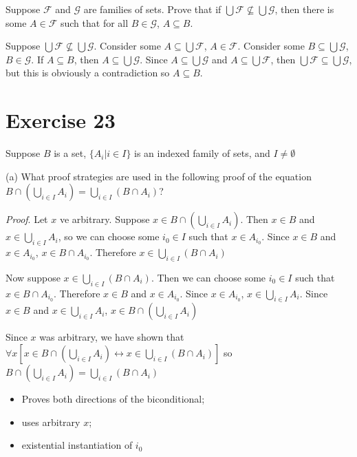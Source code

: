 \documentclass[11pt]{article}
\newcommand{\bicond}{\leftrightarrow}
\newcommand{\family}[1]{\mathcal{#1}}
\begin{document}
Suppose $\family{F}$ and $\family{G}$ are families of sets. Prove that if 
$\bigcup \family{F} \nsubseteq \bigcup \family{G}$, then there is some 
$A \in \family{F}$ such that for all $B \in \family{G}$, $A \subseteq B$.

Suppose $\bigcup \family{F} \nsubseteq \bigcup \family{G}$. Consider some 
$A \subseteq \bigcup \family{F}$, $A \in \family{F}$. Consider some 
$B \subseteq \bigcup \family{G}$, $B \in \family{G}$. If $A \subseteq B$,
then $A \subseteq \bigcup \family{G}$. Since $A \subseteq \bigcup \family{G}$
and $A \subseteq \bigcup \family{F}$, then 
$\bigcup \family{F} \subseteq \bigcup \family{G}$, but this is obviously a 
contradiction so $A \subseteq B$.

\section*{Exercise 23}

Suppose $B$ is a set, $\{ A_i | i \in I \}$ is an indexed family of sets,
and $I \neq \emptyset$

\noindent (a) What proof strategies are used in the following proof of the 
equation $B \cap (\bigcup_{i \in I} A_i) = \bigcup_{i \in I} (B \cap A_i)$?

\textit{Proof}. Let $x$ ve arbitrary. Suppose $x \in B \cap (\bigcup_{i \in I} A_i)$.
Then $x \in B$ and $x \in \bigcup_{i \in I} A_i$, so we can choose some 
$i_0 \in I$ such that $x \in A_{i_0}$. Since $x \in B$ and $x \in A_{i_0}$,
$x \in B \cap A_{i_0}$. Therefore $x \in \bigcup_{i \in I} (B \cap A_i)$

Now suppose $x \in \bigcup_{i \in I} (B \cap A_i)$. Then we can choose some 
$i_0 \in I$ such that $x \in B \cap A_{i_0}$. Therefore $x \in B$ and 
$x \in A_{i_0}$. Since $x \in A_{i_0}$, $x \in \bigcup_{i \in I} A_i$.
Since $x \in B$ and $x \in \bigcup_{i \in I} A_i$, 
$x \in B \cap (\bigcup_{i \in I} A_i)$

Since $x$ was arbitrary, we have shown that 
$\forall x [x \in B \cap (\bigcup_{i \in I} A_i) \bicond x \in \bigcup_{i \in I} (B \cap A_i)]$
so
$B \cap (\bigcup_{i \in I} A_i) = \bigcup_{i \in I} (B \cap A_i)$

\begin{itemize}
    \item Proves both directions of the biconditional;
    \item uses arbitrary $x$;
    \item existential instantiation of $i_0$
\end{itemize}
\end{document}
